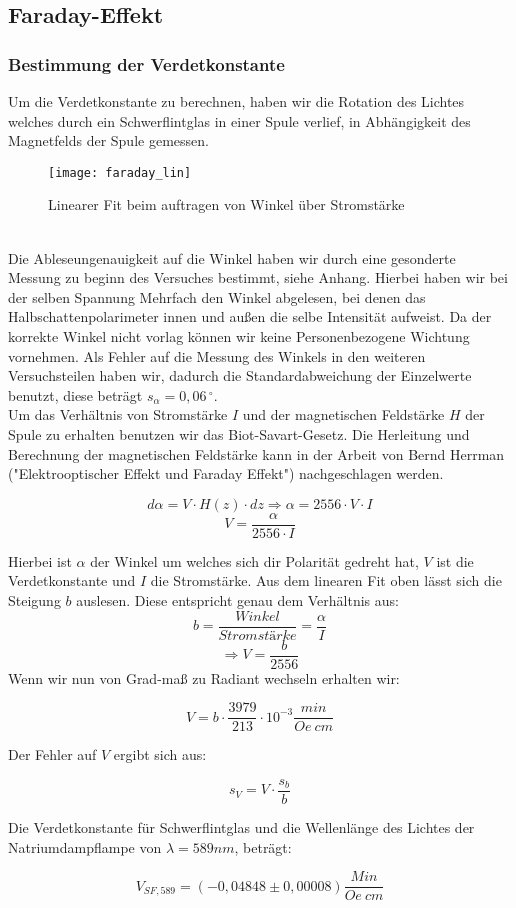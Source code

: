 
\subsection{Faraday-Effekt}
\subsubsection*{Bestimmung der Verdetkonstante}
Um die Verdetkonstante zu berechnen, haben wir die Rotation des Lichtes welches durch ein Schwerflintglas in einer Spule verlief, in Abhängigkeit des Magnetfelds der Spule gemessen.
\begin{figure}[h]
\begin{center}
\texttt{[image: faraday\_lin]}
\caption{Linearer Fit beim auftragen von Winkel über Stromstärke}
\label{fig:faraday_lin}
\end{center}
\end{figure}
~\\
Die Ableseungenauigkeit auf die Winkel haben wir durch eine gesonderte Messung zu beginn des Versuches bestimmt, siehe Anhang. Hierbei haben wir bei der selben Spannung Mehrfach den Winkel abgelesen, bei denen das Halbschattenpolarimeter innen und außen die selbe Intensität aufweist. Da der korrekte Winkel nicht vorlag können wir keine Personenbezogene Wichtung vornehmen. Als Fehler auf die Messung des Winkels in den weiteren Versuchsteilen haben wir, dadurch die Standardabweichung der Einzelwerte benutzt, diese beträgt $s_\alpha = 0,06\,^{\circ} $.\\
Um das Verhältnis von Stromstärke $I$ und der magnetischen Feldstärke $H$ der Spule zu erhalten benutzen wir das Biot-Savart-Gesetz. Die Herleitung und Berechnung der magnetischen Feldstärke kann in der Arbeit von Bernd Herrman ("Elektrooptischer Effekt und Faraday Effekt") nachgeschlagen werden.
\begin{center}
\[ d\alpha = V \cdot H(z)\cdot dz  \Rightarrow \alpha = 2556 \cdot V \cdot I\]
\[ V = \frac{\alpha}{2556 \cdot I}\]
\end{center}
Hierbei ist $\alpha$ der Winkel um welches sich dir Polarität gedreht hat, $V$ ist die Verdetkonstante und $I$ die Stromstärke. Aus dem linearen Fit oben lässt sich die Steigung $b$ auslesen. Diese entspricht genau dem Verhältnis aus:
\[b = \frac{Winkel}{Stromstärke}=\frac{\alpha}{I}\]
\[\Rightarrow V=\frac{b}{2556}\]
Wenn wir nun von Grad-maß zu Radiant wechseln erhalten wir:
\begin{center}
\[V=b \cdot \frac{3979}{213} \cdot 10^{-3} \frac{min}{Oe ~ cm} \]
\end{center}
Der Fehler auf $V$ ergibt sich aus:
\begin{center}
\[s_{V}= V \cdot \frac{s_b}{b}\]
\end{center}
Die Verdetkonstante für Schwerflintglas und die Wellenlänge des Lichtes der Natriumdampflampe von $\lambda = 589 nm$, beträgt:
\begin{center}
\[ V_{SF,589}=(-0,04848\pm0,00008) \frac{Min}{Oe~cm} \]
\end{center}

